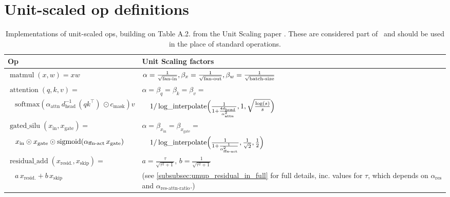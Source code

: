 \section{Unit-scaled op definitions}
\label{app:additional_unit_scaled_ops}

\begin{table}[h]
\vspace{-1em}
\caption{Implementations of unit-scaled ops, building on Table A.2. from the Unit Scaling paper \citep{Unit_Scaling}. These are considered part of \umup\ and should be used in the place of standard operations.}
\label{tab:ops_compendium}
\centering
\vspace{0.6em}
\renewcommand{\arraystretch}{1.25}
\begin{tabular}{lp{6.5cm}}
    \toprule
    Op & Unit Scaling factors \\
    \midrule
    
    $\operatorname{matmul}(x,w)=xw$
    &
    $\alpha=\frac{1}{\sqrt{\mathrm{fan{\text -}in}}}, \beta_x=\frac{1}{\sqrt{\mathrm{fan{\text -}out}}}, \beta_w=\frac{1}{\sqrt{\mathrm{batch{\text -}size}}}$
    \\[1.5em]

    $\operatorname{attention}(q,k,v)=$
    &
    $\alpha=\beta_q=\beta_k=\beta_v =$
    \\
    $\quad \mathrm{softmax}\left(\alpha_{\mathrm{attn}}  \,d_{\mathrm{head}}^{-1}\, (q k^\top)\, \odot c_\textrm{mask}\right) v$
    &
    $\quad 1/ \operatorname{log\_interpolate}\Bigl(\frac{1}{1 + \frac{4 d_{\mathrm{head}}}{\alpha_{\mathrm{attn}}^2}}, 1, \sqrt{\frac{\log(s)}{s}}\Bigr)$
    \\[2em]

    $\operatorname{gated\_silu}(x_\mathrm{in}, x_\mathrm{gate}) =$
    &
    $\alpha=\beta_{x_\mathrm{in}}=\beta_{x_\mathrm{gate}}=$
    \\
    $\quad x_\mathrm{in} \odot x_\mathrm{gate} \odot \operatorname{sigmoid}(\alpha_{\mathrm{ffn{\text -}act}}\,x_\mathrm{gate})$
    &
    $\quad 1/ \operatorname{log\_interpolate}\Bigl(\frac{1}{1 + \frac{1}{\alpha_{\mathrm{ffn{\text -}act}}^2}}, \frac{1}{\sqrt{2}}, \frac{1}{2}\Bigr)$
    \\[2em]

    $\operatorname{residual\_add}(x_\mathrm{resid.}, x_\mathrm{skip}) =$
    &
    $a=\frac{\tau}{\sqrt{\tau^2 + 1}}, \, b=\frac{1}{\sqrt{\tau^2 + 1}} \quad$
    \\
    $\quad a\, x_\mathrm{resid.} + b\,x_\mathrm{skip}$
    &
    (see \ref{subsubsec:umup_residual_in_full} for full details, inc. values for $\tau$, which depends on $\alpha_\mathrm{res}$ and $\alpha_\mathrm{res\text{-}attn\text{-}ratio}$.)
    \\[1.5em]


\end{tabular}
\end{table}
